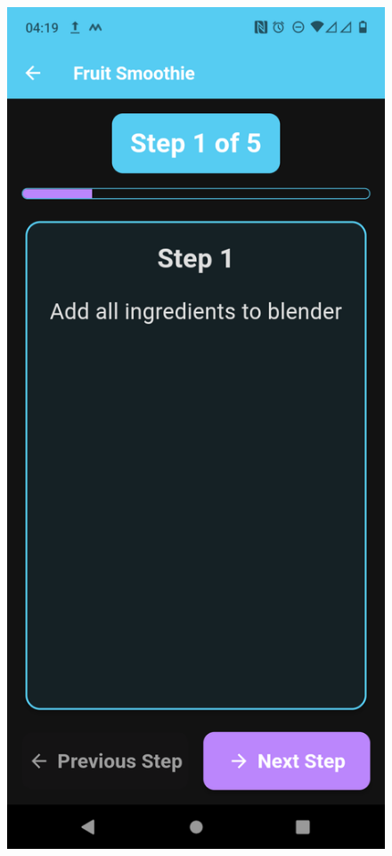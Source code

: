 \documentclass[]{project_final}
\begin{document}
\begin{figure}[ht!]
    \centering
    \begin{minipage}[t]{0.4\textwidth}
        \includegraphics[height=0.5\textheight]{STEP1.png}

\end{minipage}
\end{figure}
\end{document}
